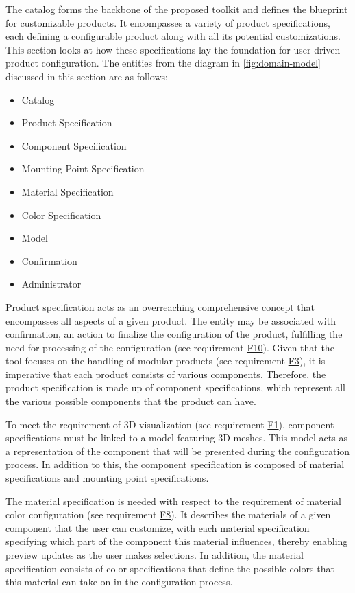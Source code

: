 The catalog forms the backbone of the proposed toolkit and defines the blueprint for customizable products. It encompasses a variety of product specifications, each defining a configurable product along with all its potential customizations. This section looks at how these specifications lay the foundation for user-driven product configuration.
The entities from the diagram in \autoref{fig:domain-model} discussed in this section are as follows:
\begin{itemize}[label=\rectanglebullet]
    \item Catalog
    \item Product Specification
    \item Component Specification
    \item Mounting Point Specification
    \item Material Specification
    \item Color Specification
    \item Model
    \item Confirmation
    \item Administrator
\end{itemize}

Product specification acts as an overreaching comprehensive concept that encompasses all aspects of a given product. The entity may be associated with confirmation, an action to finalize the configuration of the product, fulfilling the need for processing of the configuration (see requirement \hyperref[itm:F10]{F10}). Given that the tool focuses on the handling of modular products (see requirement \hyperref[itm:F3]{F3}), it is imperative that each product consists of various components. Therefore, the product specification is made up of component specifications, which represent all the various possible components that the product can have.

To meet the requirement of 3D visualization (see requirement \hyperref[itm:F1]{F1}), component specifications must be linked to a model featuring 3D meshes. This model acts as a representation of the component that will be presented during the configuration process. In addition to this, the component specification is composed of material specifications and mounting point specifications.

The material specification is needed with respect to the requirement of material color configuration (see requirement \hyperref[itm:F8]{F8}). It describes the materials of a given component that the user can customize, with each material specification specifying which part of the component this material influences, thereby enabling preview updates as the user makes selections. In addition, the material specification consists of color specifications that define the possible colors that this material can take on in the configuration process.

